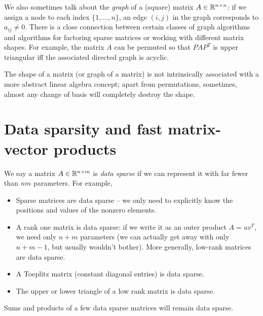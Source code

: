 \documentclass[12pt, leqno]{article}
\begin{document}
We also sometimes talk about the {\em graph} of a (square) matrix
$A \in \mathbb{R}^{n \times n}$: if we assign a node to each index
$\{1, \ldots, n\}$, an edge $(i,j)$ in the graph corresponds
to $a_{ij} \neq 0$.  There is a close connection between certain
classes of graph algorithms and algorithms for factoring sparse
matrices or working with different matrix shapes.  For example,
the matrix $A$ can be permuted so that $P A P^T$ is upper triangular
iff the associated directed graph is acyclic.

The shape of a matrix (or graph of a matrix) is not intrinsically
associated with a more abstract linear algebra concept; apart from
permutations, sometimes, almost any change of basis will completely
destroy the shape.

\section{Data sparsity and fast matrix-vector products}

We say a matrix $A \in \mathbb{R}^{n \times m}$ is {\em data sparse} if we
can represent it with far fewer than $nm$ parameters.  For example,
\begin{itemize}
\item Sparse matrices are data sparse -- we only need to explicitly
  know the positions and values of the nonzero elements.
\item A rank one matrix is data sparse: if we write it as an outer
  product $A = uv^T$, we need only $n+m$ parameters (we can actually
  get away with only $n+m-1$, but usually wouldn't bother).  More
  generally, low-rank matrices are data sparse.
\item A Toeplitz matrix (constant diagonal entries) is data sparse.
\item The upper or lower triangle of a low rank matrix is data sparse.
\end{itemize}
Sums and products of a few data sparse matrices
will remain data sparse.
\end{document}
